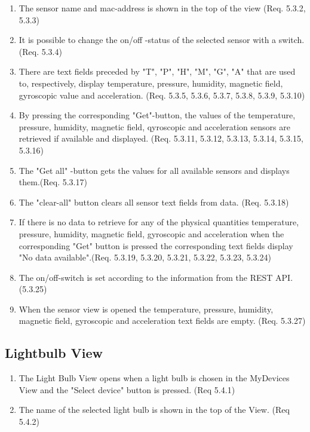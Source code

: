 \documentclass[a4paper]{article}
\newlength{\testlabellength}
\newenvironment{testlist}{\begin{enumerate}[label=\bfseries Test \thesubsection.\arabic* , labelindent=0pt, labelwidth=\testlabellength , leftmargin=2cm]}{\end{enumerate}}
\begin{document}
\begin{appendices}
\begin{testlist}
\item The sensor name and mac-address is shown in the top of the view (Req. 5.3.2, 5.3.3)
 
\item It is possible to change the on/off -status of the selected sensor with a switch. (Req. 5.3.4)

\item There are text fields preceded by "T", "P", "H", "M", "G", "A" that are used to, respectively, display temperature, pressure, humidity, magnetic field, gyroscopic value and acceleration. (Req. 5.3.5, 5.3.6, 5.3.7, 5.3.8, 5.3.9, 5.3.10)

\item By pressing the corresponding "Get"-button, the values of the temperature, pressure, humidity, magnetic field, qyroscopic and acceleration sensors are retrieved if available and displayed. (Req. 5.3.11, 5.3.12, 5.3.13, 5.3.14, 5.3.15, 5.3.16)

\item The "Get all" -button gets the values for all available sensors and displays them.(Req. 5.3.17)
\item The "clear-all" button clears all sensor text fields from data. (Req. 5.3.18)
\item If there is no data to retrieve for any of the physical quantities temperature, pressure, humidity, magnetic field, gyroscopic and acceleration when the corresponding "Get" button is pressed the corresponding text fields display "No data available".(Req. 5.3.19, 5.3.20, 5.3.21, 5.3.22, 5.3.23, 5.3.24)

\item The on/off-switch is set according to the information from the REST API. (5.3.25)

\item When the sensor view is opened the temperature, pressure, humidity, magnetic field, gyroscopic and acceleration text fields are empty. (Req. 5.3.27)

\end{testlist}

\subsection{Lightbulb View}
\begin{testlist}
	\item The Light Bulb View opens when a light bulb is chosen in the MyDevices View and the "Select device" button is pressed. (Req 5.4.1)
	\item The name of the selected light bulb is shown in the top of the View. (Req 5.4.2)
  

\end{testlist}
\end{appendices}
\end{document}
